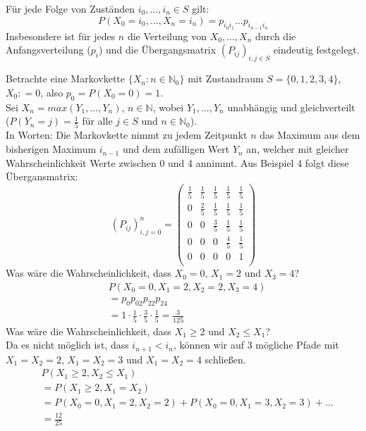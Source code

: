 \documentclass[a4paper,12pt]{article}
\begin{document}
\begin{tcolorbox}[breakable, colframe=green, colback=white, title=Satz 6]
Für jede Folge von Zuständen $i_0, ..., i_n \in S$ gilt:
$$
P(X_0 = i_0, ..., X_n = i_n) = p_{i_0i_1}...p_{i_{n-1}i_n}
$$
Insbesondere ist für jedes $n$ die Verteilung von $X_0, ...,X_n$ durch die Anfangsverteilung ($p_i$) und die 
Übergangsmatrix $(P_{ij})_{i,j \in S}$ eindeutig festgelegt.
\end{tcolorbox}

\begin{tcolorbox}[breakable, colframe=blue, colback=white, title=Beispiel 7]
Betrachte eine Markovkette $\{ X_n: n \in \mathbb{N}_0\}$ mit Zustandraum $S = \{0,1,2,3,4\}$, $X_0: = 0$, also $p_0 = P(X_0 = 0)=1$.\\
Sei $X_n = max(Y_1, ..., Y_n)$, $n \in \mathbb{N}$, wobei $Y_1, ..., Y_n$ unabhängig und gleichverteilt ($P(Y_n = j) = \frac{1}{5}$ für alle $j \in S$ und $n \in \mathbb{N}_0$).\\
In Worten: Die Markovkette nimmt zu jedem Zeitpunkt $n$ das Maximum aus dem bisherigen Maximum $i_{n-1}$ und dem zufälligen Wert $Y_n$ an,
welcher mit gleicher Wahrscheinlichkeit Werte zwischen 0 und 4 annimmt. Aus Beispiel 4 folgt diese Übergansmatrix:
$$
(P_{ij})_{i,j = 0}^n =
\begin{pmatrix}
\frac{1}{5} & \frac{1}{5} & \frac{1}{5} & \frac{1}{5} & \frac{1}{5} \\
0 & \frac{2}{5} & \frac{1}{5} & \frac{1}{5} & \frac{1}{5} \\
0 & 0 & \frac{3}{5} & \frac{1}{5} & \frac{1}{5}\\
0 & 0& 0 & \frac{4}{5} & \frac{1}{5} \\
0 & 0 & 0 & 0 & 1 \\
\end{pmatrix}
$$
Was wäre die Wahrscheinlichkeit, dass $X_0 = 0$, $X_1 = 2$ und $X_3 = 4$?
\begin{align*}
&  P(X_0 = 0, X_1 = 2, X_2 = 2, X_3 = 4)\\
& =  p_0p_{02}p_{22}p_{24} \\
& =  1 \cdot \frac{1}{5} \cdot \frac{3}{5} \cdot \frac{1}{5} = \frac{3}{125}
\end{align*}
Was wäre die Wahrscheinlichkeit, dass $X_1 \geq 2$ und $X_2 \leq X_1$?\\
Da es nicht möglich ist, dass $i_{n+1} < i_n$, können wir auf 3 mögliche Pfade mit $X_1 = X_2 = 2$, $X_1 = X_2 = 3$ und $X_1 = X_2 = 4$ schließen. 
\begin{align*}
&  P(X_1 \geq 2, X_2 \leq X_1) \\
& =  P(X_1 \geq 2, X_1 = X_2) \\
& =  P(X_0 = 0, X_1 = 2, X_2 = 2) + P(X_0 = 0, X_1 = 3, X_2 = 3) + \dots \\
& = \frac{12}{25}
\end{align*}
\end{tcolorbox}
\end{document}
